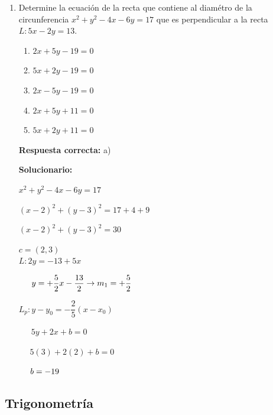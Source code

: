 \begin{enumerate}[resume]
	
	\item Determine la ecuación de la recta que contiene al diamétro de la circunferencia $x^2+y^2-4x-6y=17$ que es perpendicular a la recta $L:5x-2y=13$.
	\begin{enumerate}[label=\alph*)]
		\item $2x+5y-19=0$
		\item $5x+2y-19=0$
		\item $2x-5y-19=0$
		\item $2x+5y+11=0$
		\item $5x+2y+11=0$
	\end{enumerate}
	
	\textbf{Respuesta correcta:} a)
	
	\vspace{2mm}
	\textbf{Solucionario:}
	
	$x^2+y^2-4x-6y=17$
	
	$(x-2)^2+(y-3)^2=17+4+9$
	
	$(x-2)^2+(y-3)^2=30$
	
	$c=(2,3)$\\
	
	$L:2y =  - 13 + 5x$
	
	$\,\,\,\,\,\,\,\,\,y =  + \dfrac{5}{2}x - \dfrac{{13}}{2} \to {m_1} =  + \dfrac{5}{2}\\$
	
	
	${L_p}:y - {y_0} =  - \dfrac{2}{5}(x - {x_0})$
	
	$\,\,\,\,\,\,\,\,\,5y + 2x + b = 0$
	
	$\,\,\,\,\,\,\,\,5(3) + 2(2) + b = 0$
	
	$\,\,\,\,\,\,\,\,b =  - 19\\$
	
	
	
	
	
\end{enumerate}


\subsection*{Trigonometría}

